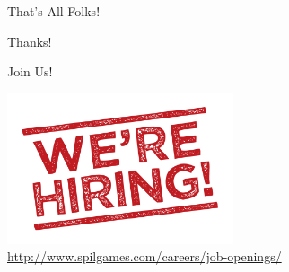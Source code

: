\documentclass[aspectratio=169]{beamer}
\begin{document}
\begin{frame}{That's All Folks!}
    \begin{center}
        \huge{Thanks!}
    \end{center}
\end{frame}

\begin{frame}{Join Us!}
    \begin{center}
        \includegraphics[width=0.5\textwidth]{images/hiring.png}\\
        \href{http://www.spilgames.com/careers/job-openings/}{\large{http://www.spilgames.com/careers/job-openings/}}
    \end{center}
\end{frame}
\end{document}
